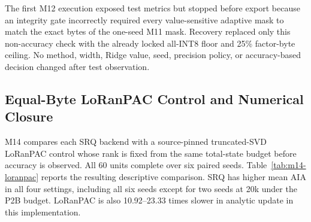 \documentclass[runningheads]{llncs}
\begin{document}
The first M12 execution exposed test metrics but stopped before export because
an integrity gate incorrectly required every value-sensitive adaptive mask to
match the exact bytes of the one-seed M11 mask. Recovery replaced only this
non-accuracy check with the already locked all-INT8 floor and 25\% factor-byte
ceiling. No method, width, Ridge value, seed, precision policy, or
accuracy-based decision changed after test observation.

\subsection{Equal-Byte LoRanPAC Control and Numerical Closure}

M14 compares each SRQ backend with a source-pinned truncated-SVD LoRanPAC
control whose rank is fixed from the same total-state budget before accuracy
is observed. All 60 units complete over six paired seeds. Table~\ref{tab:m14-loranpac}
reports the resulting descriptive comparison. SRQ has higher mean AIA in all
four settings, including all six seeds except for two seeds at 20k under the
P2B budget. LoRanPAC is also 10.92--23.33 times slower in analytic update in
this implementation.

\begin{table}
\caption{Multi-seed equal-byte comparison with truncated-SVD LoRanPAC. Values
are mean $\pm$ sample standard deviation over six paired train-only seeds;
$\Delta$AIA is SRQ minus LoRanPAC. M14 remains a formal numerical-gate failure.}
\label{tab:m14-loranpac}
\centering
\small
{}
\end{table}
\end{document}
